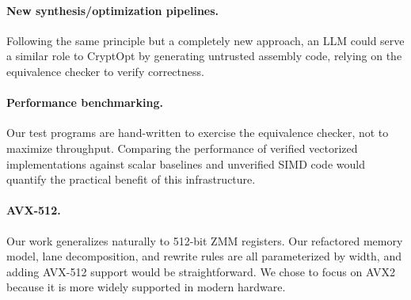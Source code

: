 \paragraph{New synthesis/optimization pipelines.}
Following the same principle but a completely new approach, an LLM could serve a similar role to CryptOpt by generating untrusted assembly code, relying on the equivalence checker to verify correctness. 

\paragraph{Performance benchmarking.}
Our test programs are hand-written to exercise the equivalence checker, not to maximize throughput.
Comparing the performance of verified vectorized implementations against scalar baselines and unverified SIMD code would quantify the practical benefit of this infrastructure.

\paragraph{AVX-512.}
Our work generalizes naturally to 512-bit ZMM registers. Our refactored memory model, lane decomposition, and rewrite rules are all parameterized by width, and adding AVX-512 support would be straightforward. We chose to focus on AVX2 because it is more widely supported in modern hardware.